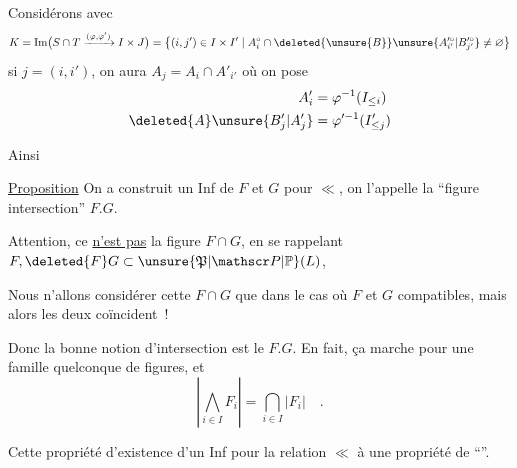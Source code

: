 Considérons
avec
\[
 K=\operatorname{Im}\bigl(S\cap T\xrightarrow{(\varphi,\varphi')} I\times J\bigr)
 =\bigl\{(i,j')\in I\times I'\mid A_i^\circ\cap \deleted{\unsure{B}}\unsure{A_{i'}^{\prime\circ}|B_{j'}^{\prime\circ}}\ne\varnothing\bigr\}
\]
si $j=(i,i')$, on aura $\boxed{A_j=A_i\cap A'_{i'}}$
où on pose
\[
 \begin{aligned}
 A_i'&=\varphi^{-1}(I_{\leq i})\\
 \deleted{A}\unsure{B_j'|A_j'}&=\varphi^{\prime-1}(I'_{\leq j})
 \end{aligned}
\]


Ainsi

\uline{Proposition} On a construit un Inf de $F$ et $G$ pour $\ll$, on l'appelle la ``figure intersection'' $F.G$.

Attention, ce \uline{n'est pas}  la figure $F\cap G$,  en se rappelant $F,\deleted{F}G\subset\unsure{\mathfrak P|\mathscr P|\mathbb P}(L)$, 

Nous n'allons considérer cette $F\cap G$ que dans le cas où $F$ et $G$ compatibles, mais alors les deux coïncident~!

Donc la bonne notion d'intersection est le $F.G$. En fait, ça marche pour une famille quelconque de figures, et
\[
 \left|\bigwedge_{i\in I} F_i\right|=\bigcap_{i\in I}|F_i|\quad .
\]

Cette propriété d'existence d'un Inf pour la relation $\ll$   à une propriété de ``\uline{}''.

